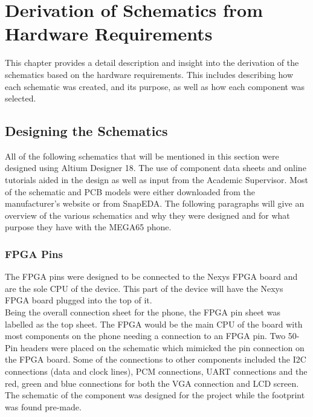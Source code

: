 
\chapter{Derivation of Schematics from Hardware Requirements} %

\label{Chapter5} %

This chapter provides a detail description and insight into the derivation of the schematics based on the hardware requirements. This includes describing how each schematic was created, and its purpose, as well as how each component was selected.


\section{Designing the Schematics}

	All of the following schematics that will be mentioned in this section were designed using Altium Designer 18. The use of component data sheets and online tutorials aided in the design as well as input from the Academic Supervisor. Most of the schematic and PCB models were either downloaded from the manufacturer's website or from SnapEDA. The following paragraphs will give an overview of the various schematics and why they were designed and for what purpose they have with the MEGA65 phone.

\subsection{FPGA Pins}
\label{chap:FPGA}
	The FPGA pins were designed to be connected to the Nexys FPGA board and are the sole CPU of the device. This part of the device will have the Nexys FPGA board plugged into the top of it.\\
Being the overall connection sheet for the phone, the FPGA pin sheet was labelled as the top sheet. The FPGA would be the main CPU of the board with most components on the phone needing a connection to an FPGA pin. Two 50-Pin headers were placed on the schematic which mimicked the pin connection on the FPGA board. Some of the connections to other components included the I2C connections (data and clock lines), PCM connections, UART connections and the red, green and blue connections for both the VGA connection and LCD screen.\\
The schematic of the component was designed for the project while the footprint was found pre-made. 

